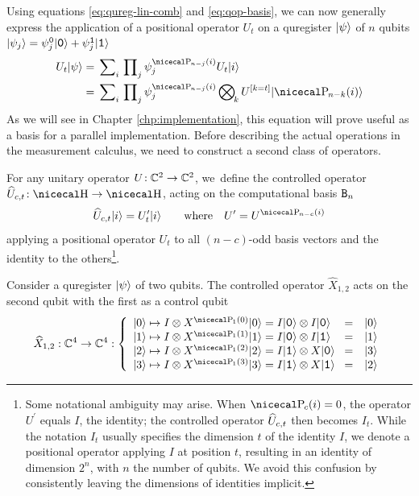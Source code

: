 \documentclass[a4paper,11pt, oneside]{report}
\begin{document}
Using equations \eqref{eq:qureg-lin-comb} and \eqref{eq:qop-basis}, we can now generally express the application of a positional operator $U_t$ on a quregister $\lvert\psi\rangle$ of $n$ qubits $\ket {\psi_j}= \psi_j^\bin0\ketb 0 + \psi_j^\bin1\ketb 1$
\begin{equation}\label{eq:qop-qureg}
\begin{split}
U_t\ket\psi &= \Sum{i}\Product{j}\psi_j^{\parity_{n-j}(i)} U_t \ket i \\
 &= \Sum{i}\Product{j}\psi_j^{\parity_{n-j}(i)} \Tensor{k} U^\ive{k=t} \ket {\parity_{n-k}(i)}
\end{split}
\end{equation}
As we will see in Chapter \ref{chp:implementation}, this equation will prove useful as a basis for a parallel implementation. Before describing the actual operations in the measurement calculus, we need to construct a second class of operators.


 For any unitary operator $U\!:\mathbb{C}^2\to\mathbb{C}^2$, we~define the controlled operator $\cU_{c,t}\!:\hilbert\to\hilbert$, acting on the computational basis $\cbasis_n$
\begin{equation}\label{cop-basis}
\cU_{c,t}\ket i = U^\prime_t\ket i\qquad\text{where}\quad U^\prime = U^{\parity_{n-c}(i)}
\end{equation}
applying a positional operator $U_t$ to all $(n-c)$-odd basis vectors and the identity to the others\footnote{Some notational ambiguity may arise. When $\parity_c(i) = 0$, the operator $U^\prime$ equals $I$, the identity; the controlled operator $\widehat{U}_{c,t}$ then becomes $I_t$. While the notation $I_t$ usually specifies the dimension $t$ of the identity $I$, we denote a positional operator applying $I$ at position $t$, resulting in an identity of dimension $2^n$, with $n$ the number of qubits. We avoid this confusion by consistently leaving the dimensions of identities implicit.}.


\example Consider a quregister $\lvert\psi\rangle$ of two qubits. The controlled operator $\widehat{X}_{1,2}$ acts on the second qubit with the first as a control qubit
\begin{equation*}
\widehat{X}_{1,2} : \complex^4 \to \complex^4 : \left\{
\begin{array}{lcl}
\ket 0 \mapsto I\otimes X^{\parity_1(0)}\ket 0 = I\ketb 0 \otimes I\ketb 0\! &=& \ket 0\\
\ket 1 \mapsto I\otimes X^{\parity_1(1)}\ket 1 = I\ketb 0 \otimes I\ketb 1\! &=& \ket 1\\
\ket 2 \mapsto I\otimes X^{\parity_1(2)}\ket 2 = I\ketb 1 \otimes X\ketb 0\! &=& \ket 3\\
\ket 3 \mapsto I\otimes X^{\parity_1(3)}\ket 3 = I\ketb 1 \otimes X\ketb 1\! &=& \ket 2
\end{array} \right.
\end{equation*}
\end{document}
